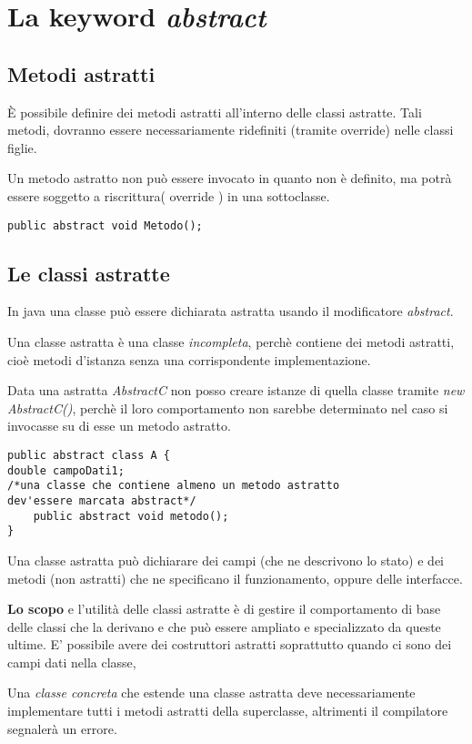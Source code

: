 \section{La keyword \textit{abstract}}
\subsection{Metodi astratti}
È possibile definire dei metodi astratti all'interno delle classi astratte. Tali metodi, dovranno essere necessariamente ridefiniti (tramite override) nelle classi figlie. 

Un metodo astratto non può essere invocato in quanto non è definito, ma potrà essere soggetto a riscrittura( override ) in una sottoclasse.
\begin{lstlisting}
public abstract void Metodo();
\end{lstlisting}
\subsection{Le classi astratte}
In java una classe può essere dichiarata astratta usando il modificatore \textit{abstract}. 

Una classe astratta è una classe \textit{incompleta}, perchè contiene dei metodi astratti, cioè metodi d'istanza senza una corrispondente implementazione.

Data una astratta \textit{AbstractC} non posso creare istanze di quella classe tramite \textit{new AbstractC()}, perchè il loro comportamento non sarebbe determinato nel caso si invocasse su di esse un metodo astratto.
\begin{lstlisting}
public abstract class A {
double campoDati1;
/*una classe che contiene almeno un metodo astratto
dev'essere marcata abstract*/
	public abstract void metodo(); 
}
\end{lstlisting}
Una classe astratta può dichiarare dei campi (che ne descrivono lo stato) e dei metodi (non astratti) che ne specificano il funzionamento, oppure delle interfacce.

\textbf{Lo scopo} e l’utilità delle classi astratte è di gestire il comportamento di base delle classi che la derivano e che può essere ampliato e specializzato da queste ultime.
E' possibile avere dei costruttori astratti soprattutto quando ci sono dei campi dati nella classe,

Una \textit{classe concreta} che estende una classe astratta deve necessariamente implementare tutti i metodi astratti della superclasse, altrimenti il compilatore segnalerà un errore.

